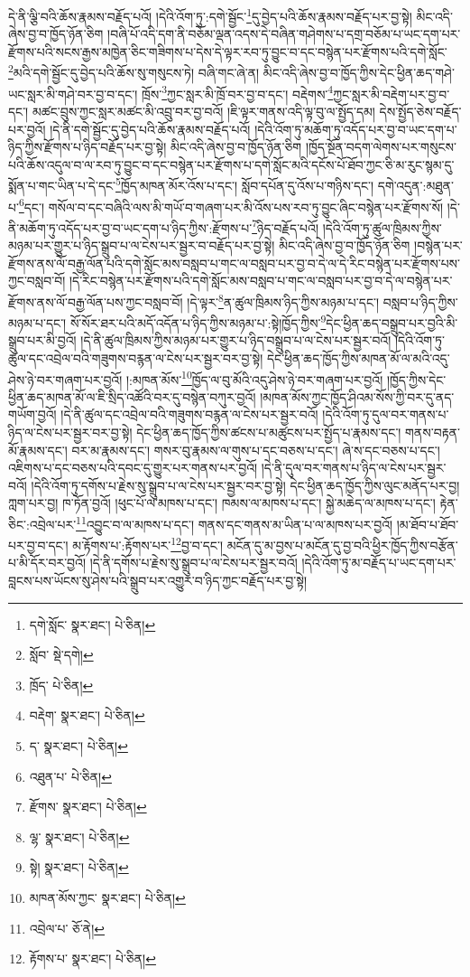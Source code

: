 དེ་ནི་ལྕི་བའི་ཆོས་རྣམས་བརྗོད་པའོ། །དེའི་འོག་ཏུ་:དགེ་སྦྱོང་\footnote{དགེ་སློང་  སྣར་ཐང་།  པེ་ཅིན། }དུ་བྱེད་པའི་ཆོས་རྣམས་བརྗོད་པར་བྱ་སྟེ། མིང་འདི་ཞེས་བྱ་བ་ཁྱོད་ཉོན་ཅིག །བཞི་པོ་འདི་དག་ནི་བཅོམ་ལྡན་འདས་དེ་བཞིན་གཤེགས་པ་དགྲ་བཅོམ་པ་ཡང་དག་པར་རྫོགས་པའི་སངས་རྒྱས་མཁྱེན་ཅིང་གཟིགས་པ་དེས་དེ་ལྟར་རབ་ཏུ་བྱུང་བ་དང་བསྙེན་པར་རྫོགས་པའི་དགེ་སློང་\footnote{སློབ་  སྡེ་དགེ། }མའི་དགེ་སྦྱོང་དུ་བྱེད་པའི་ཆོས་སུ་གསུངས་ཏེ། བཞི་གང་ཞེ་ན། མིང་འདི་ཞེས་བྱ་བ་ཁྱོད་ཀྱིས་དེང་ཕྱིན་ཆད་གཤེ་ཡང་སླར་མི་གཤེ་བར་བྱ་བ་དང་། ཁྲོས་\footnote{ཁྲོད་  པེ་ཅིན། }ཀྱང་སླར་མི་ཁྲོ་བར་བྱ་བ་དང་། བརྡེགས་\footnote{བརྡེག་  སྣར་ཐང་།  པེ་ཅིན། }ཀྱང་སླར་མི་བརྡེག་པར་བྱ་བ་དང་། མཚང་བྲུས་ཀྱང་སླར་མཚང་མི་འབྲུ་བར་བྱ་བའོ། །ཇི་ལྟར་གནས་འདི་ལྟ་བུ་ལ་སྤྱོད་དམ། དེས་སྤྱོད་ཅེས་བརྗོད་པར་བྱའོ། །དེ་ནི་དགེ་སྦྱོང་དུ་བྱེད་པའི་ཆོས་རྣམས་བརྗོད་པའོ། །དེའི་འོག་ཏུ་མཆོག་ཏུ་འདོད་པར་བྱ་བ་ཡང་དག་པ་ཉིད་ཀྱིས་རྫོགས་པ་ཉིད་བརྗོད་པར་བྱ་སྟེ། མིང་འདི་ཞེས་བྱ་བ་ཁྱོད་ཉོན་ཅིག །ཁྱོད་སྔོན་བདག་ལེགས་པར་གསུངས་པའི་ཆོས་འདུལ་བ་ལ་རབ་ཏུ་བྱུང་བ་དང་བསྙེན་པར་རྫོགས་པ་དགེ་སློང་མའི་དངོས་པོ་ཐོབ་ཀྱང་ཅི་མ་རུང་སྙམ་དུ་སྨོན་པ་གང་ཡིན་པ་དེ་དང་\footnote{ད་  སྣར་ཐང་།  པེ་ཅིན། }ཁྱོད་མཁན་མོར་འོས་པ་དང་། སློབ་དཔོན་དུ་འོས་པ་གཉིས་དང་། དགེ་འདུན་:མཐུན་པ་\footnote{འཐུན་པ་  པེ་ཅིན། }དང་། གསོལ་བ་དང་བཞིའི་ལས་མི་གཡོ་བ་གཞག་པར་མི་འོས་པས་རབ་ཏུ་བྱུང་ཞིང་བསྙེན་པར་རྫོགས་སོ། །དེ་ནི་མཆོག་ཏུ་འདོད་པར་བྱ་བ་ཡང་དག་པ་ཉིད་ཀྱིས་:རྫོགས་པ་\footnote{རྫོགས་  སྣར་ཐང་།  པེ་ཅིན། }ཉིད་བརྗོད་པའོ། །དེའི་འོག་ཏུ་ཚུལ་ཁྲིམས་ཀྱིས་མཉམ་པར་གྱུར་པ་ཉིད་སྒྲུབ་པ་ལ་ངེས་པར་སྦྱར་བ་བརྗོད་པར་བྱ་སྟེ། མིང་འདི་ཞེས་བྱ་བ་ཁྱོད་ཉོན་ཅིག །བསྙེན་པར་རྫོགས་ནས་ལོ་བརྒྱ་ལོན་པའི་དགེ་སློང་མས་བསླབ་པ་གང་ལ་བསླབ་པར་བྱ་བ་དེ་ལ་དེ་རིང་བསྙེན་པར་རྫོགས་པས་ཀྱང་བསླབ་བོ། །དེ་རིང་བསྙེན་པར་རྫོགས་པའི་དགེ་སློང་མས་བསླབ་པ་གང་ལ་བསླབ་པར་བྱ་བ་དེ་ལ་བསྙེན་པར་རྫོགས་ནས་ལོ་བརྒྱ་ལོན་པས་ཀྱང་བསླབ་བོ། །དེ་ལྟར་\footnote{ལྷ་  སྣར་ཐང་།  པེ་ཅིན། }ན་ཚུལ་ཁྲིམས་ཉིད་ཀྱིས་མཉམ་པ་དང་། བསླབ་པ་ཉིད་ཀྱིས་མཉམ་པ་དང་། སོ་སོར་ཐར་པའི་མདོ་འདོན་པ་ཉིད་ཀྱིས་མཉམ་པ་:སྟེ།ཁྱོད་ཀྱིས་\footnote{སྟེ།  སྣར་ཐང་།  པེ་ཅིན། }དེང་ཕྱིན་ཆད་བསྒྲུབ་པར་བྱའི་མི་སྒྲུབ་པར་མི་བྱའོ། །དེ་ནི་ཚུལ་ཁྲིམས་ཀྱིས་མཉམ་པར་གྱུར་པ་ཉིད་བསྒྲུབ་པ་ལ་ངེས་པར་སྦྱར་བའོ། །དེའི་འོག་ཏུ་ཚུལ་དང་འབྲེལ་བའི་གཟུགས་བརྙན་ལ་ངེས་པར་སྦྱར་བར་བྱ་སྟེ། དེང་ཕྱིན་ཆད་ཁྱོད་ཀྱིས་མཁན་མོ་ལ་མའི་འདུ་ཤེས་ཉེ་བར་གཞག་པར་བྱའོ། །:མཁན་མོས་\footnote{མཁན་མོས་ཀྱང་  སྣར་ཐང་།  པེ་ཅིན། }ཁྱོད་ལ་བུ་མོའི་འདུ་ཤེས་ཉེ་བར་གཞག་པར་བྱའོ། །ཁྱོད་ཀྱིས་དེང་ཕྱིན་ཆད་མཁན་མོ་ལ་ཇི་སྲིད་འཚོའི་བར་དུ་བསྙེན་བཀུར་བྱའོ། །མཁན་མོས་ཀྱང་ཁྱོད་ཤིའམ་སོས་ཀྱི་བར་དུ་ནད་གཡོག་བྱའོ། །དེ་ནི་ཚུལ་དང་འབྲེལ་བའི་གཟུགས་བརྙན་ལ་ངེས་པར་སྦྱར་བའོ། །དེའི་འོག་ཏུ་དུལ་བར་གནས་པ་ཉིད་ལ་ངེས་པར་སྦྱར་བར་བྱ་སྟེ། དེང་ཕྱིན་ཆད་ཁྱོད་ཀྱིས་ཚངས་པ་མཚུངས་པར་སྤྱོད་པ་རྣམས་དང་། གནས་བརྟན་མོ་རྣམས་དང་། བར་མ་རྣམས་དང་། གསར་བུ་རྣམས་ལ་གུས་པ་དང་བཅས་པ་དང་། ཞེ་ས་དང་བཅས་པ་དང་། འཇིགས་པ་དང་བཅས་པའི་དབང་དུ་གྱུར་པར་གནས་པར་བྱའོ། །དེ་ནི་དུལ་བར་གནས་པ་ཉིད་ལ་ངེས་པར་སྦྱར་བའོ། །དེའི་འོག་ཏུ་དགོས་པ་རྗེས་སུ་སྒྲུབ་པ་ལ་ངེས་པར་སྦྱར་བར་བྱ་སྟེ། དེང་ཕྱིན་ཆད་ཁྱོད་ཀྱིས་ལུང་མནོད་པར་བྱ། ཀླག་པར་བྱ། ཁ་ཏོན་བྱའོ། །ཕུང་པོ་ལ་མཁས་པ་དང་། ཁམས་ལ་མཁས་པ་དང་། སྐྱེ་མཆེད་ལ་མཁས་པ་དང་། རྟེན་ཅིང་:འབྲེལ་པར་\footnote{འབྲེལ་པ་  ཅོ་ནེ། }འབྱུང་བ་ལ་མཁས་པ་དང་། གནས་དང་གནས་མ་ཡིན་པ་ལ་མཁས་པར་བྱའོ། །མ་ཐོབ་པ་ཐོབ་པར་བྱ་བ་དང་། མ་རྟོགས་པ་:རྟོགས་པར་\footnote{རྟོགས་པ་  སྣར་ཐང་།  པེ་ཅིན། }བྱ་བ་དང་། མངོན་དུ་མ་བྱས་པ་མངོན་དུ་བྱ་བའི་ཕྱིར་ཁྱོད་ཀྱིས་བརྩོན་པ་མི་དོར་བར་བྱའོ། །དེ་ནི་དགོས་པ་རྗེས་སུ་སྒྲུབ་པ་ལ་ངེས་པར་སྦྱར་བའོ། །དེའི་འོག་ཏུ་མ་བརྗོད་པ་ཡང་དག་པར་བླངས་པས་ཡོངས་སུ་ཤེས་པའི་སྒྲུབ་པར་འགྱུར་བ་ཉིད་ཀྱང་བརྗོད་པར་བྱ་སྟེ། 